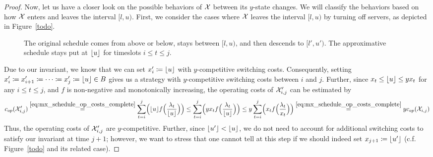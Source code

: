 \begin{proof}
Now, let us have a closer look on the possible behaviors of $\mathcal{X}$ between its $y$-state changes. We will classify the behaviors based on how $\mathcal{X}$ enters and leaves the interval $[l,u)$. First, we consider the cases where $\mathcal{X}$ leaves the interval $[l,u)$ by turning off servers, as depicted in Figure~\ref{todo}.
\begin{figure}[H]
\captionsetup[subfigure]{labelformat=empty}
\begin{subfigure}[b]{0.49\textwidth}

\end{subfigure}
\hfill
\begin{subfigure}[b]{0.49\textwidth}

\end{subfigure}
\caption{The original schedule comes from above or below, stays between $[l,u)$, and then descends to $[l',u')$. The approximative schedule stays put at $\lfloor u\rfloor$ for timeslots $i\le t\le j$.}
\end{figure}
Due to our invariant, we know that we can set $x_i'\coloneqq \lfloor u\rfloor$ with $y$-competitive switching costs. Consequently, setting $x_i'\coloneqq x_{i+1}'\coloneqq\dotsb\coloneqq x_j'\coloneqq \lfloor u\rfloor\in B$ gives us a strategy with $y$-competitive switching costs between $i$ and $j$. Further, since $x_t\le \lfloor u\rfloor\le yx_t$ for any $i\le t\le j$, and $f$ is non-negative and monotonically increasing, the operating costs of $\mathcal{X}'_{i,j}$ can be estimated by
\begin{equation*}
	c_{op}(\mathcal{X}_{i,j}')\stackrel{\eqref{eq:mx_schedule_op_costs_complete}}{=}\sum\limits_{t=i}^j\Bigl(\lfloor u\rfloor f\Bigl(\frac{\lambda_t}{\lfloor u\rfloor}\Bigr)\Bigr)\le\sum\limits_{t=i}^j\Bigl(yx_tf\Bigl(\frac{\lambda_t}{\lfloor u\rfloor}\Bigr)\Bigr)\le y\sum\limits_{t=i}^j\Bigl(x_tf\Bigl(\frac{\lambda_t}{x_t}\Bigr)\Bigr)\stackrel{\eqref{eq:mx_schedule_op_costs_complete}}{=}yc_{op}(\mathcal{X}_{i,j})
\end{equation*}
Thus, the operating costs of $\mathcal{X}_{i,j}'$ are $y$-competitive. Further, since $\lfloor u'\rfloor<\lfloor u\rfloor$, we do not need to account for additional switching costs to satisfy our invariant at time $j+1$; however, we want to stress that one cannot tell at this step if we should indeed set $x_{j+1}\coloneqq \lfloor u'\rfloor$ (c.f. Figure~\ref{todo} and its related case). 
	

\end{proof}
